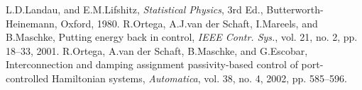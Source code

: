 \documentclass[letterpaper, 10pt, conference]{ieeeconf}  %
\begin{document}
\begin{thebibliography}{99}
%
L.D.Landau, and E.M.Lifshitz, \textit{Statistical Physics},  3rd Ed.,  Butterworth-Heinemann, Oxford, 1980.
%
%
%
R.Ortega, A.J.van der Schaft, I.Mareels, and B.Maschke,  Putting energy back in control,
 \textit{IEEE Contr. Sys.},
vol. 21, no. 2, pp. 18--33, 2001.
R.Ortega, A.van der Schaft, B.Maschke, and G.Escobar, Interconnection and damping assignment passivity-based control
of port-controlled Hamiltonian systems, \textit{Automatica}, vol. 38, no. 4, 2002, pp. 585--596.


\end{thebibliography}
\end{document}
